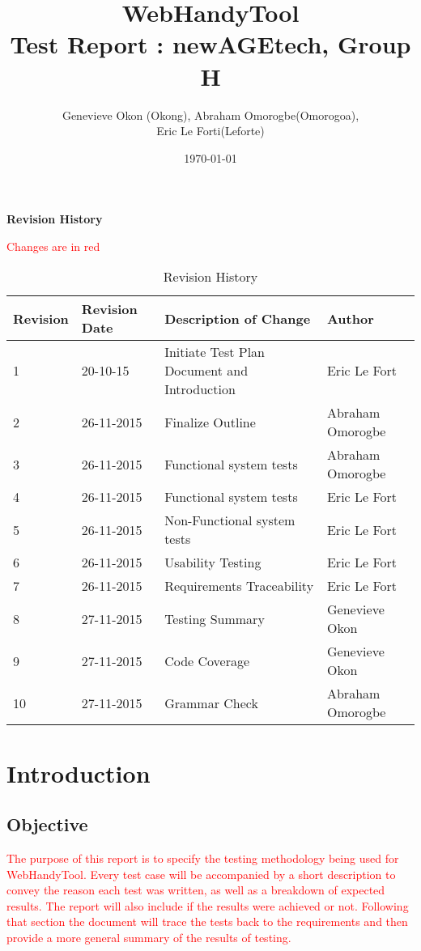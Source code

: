 \documentclass[12pt, titlepage]{article}
\begin{document}
\title{WebHandyTool \\
 Test Report : newAGEtech, Group H }
\author{Genevieve Okon (Okong), Abraham Omorogbe(Omorogoa),\\
 Eric Le Forti(Leforte)}
\date{\today}
\maketitle

\tableofcontents
\listoftables
\pagebreak

\begin{center}\textbf{Revision History}\end{center}
\textcolor{red}{Changes are in red}
\begin{table}[h!]
\centering
	\begin{tabular}{| p{1.5cm} | p{2.5cm} | p{7cm} |p{3cm} |}    \hline
	Revision  &Revision Date &Description of Change &Author\\ \hline
	1& 20-10-15 &Initiate Test Plan Document  and Introduction&Eric Le Fort\\ \hline
	2&26-11-2015&Finalize Outline & Abraham Omorogbe\\ \hline	
3&26-11-2015&Functional system tests& Abraham Omorogbe\\ \hline
4&26-11-2015&Functional system tests& Eric Le Fort\\ \hline
5&26-11-2015&Non-Functional system tests& Eric Le Fort\\ \hline
6 &26-11-2015&Usability Testing & Eric Le Fort\\ \hline
7& 26-11-2015& Requirements Traceability & Eric Le Fort\\ \hline
8& 27-11-2015 &Testing Summary& Genevieve Okon\\ \hline
9& 27-11-2015 &Code Coverage& Genevieve Okon\\ \hline
10& 27-11-2015 &Grammar Check& Abraham Omorogbe\\ \hline
	
       \end{tabular}
       \caption{Revision History}
       \label{table:Revision History}
\end{table}





\section{Introduction}
\subsection{Objective}
\textcolor{red}{The purpose of this report is to specify the testing methodology being used for WebHandyTool. Every test case will be accompanied by a short description to convey the reason each test was written, as well as a breakdown of expected results. The report will also include if the results were achieved or not. Following that section the document will trace the tests back to the requirements and then provide a more general summary of the results of testing.}
\end{document}
